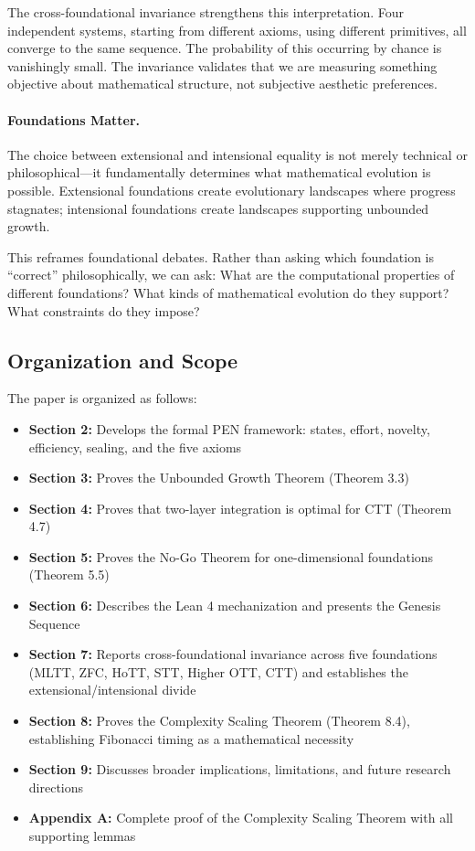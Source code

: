 \documentclass[11pt]{article}
\theoremstyle{definition}
\theoremstyle{remark}
\begin{document}
The cross-foundational invariance strengthens this interpretation. Four independent systems,
starting from different axioms, using different primitives, all converge to the same sequence. The
probability of this occurring by chance is vanishingly small. The invariance validates that we are
measuring something objective about mathematical structure, not subjective aesthetic preferences.

\paragraph{Foundations Matter.}
The choice between extensional and intensional equality is not merely technical or philosophical---it
fundamentally determines what mathematical evolution is possible. Extensional foundations create
evolutionary landscapes where progress stagnates; intensional foundations create landscapes supporting
unbounded growth.

This reframes foundational debates. Rather than asking which foundation is ``correct'' philosophically,
we can ask: What are the computational properties of different foundations? What kinds of mathematical
evolution do they support? What constraints do they impose?

\subsection{Organization and Scope}

The paper is organized as follows:

\begin{itemize}
\item \textbf{Section 2:} Develops the formal PEN framework: states, effort, novelty, efficiency, sealing, and
the five axioms
\item \textbf{Section 3:} Proves the Unbounded Growth Theorem (Theorem 3.3)
\item \textbf{Section 4:} Proves that two-layer integration is optimal for CTT (Theorem 4.7)
\item \textbf{Section 5:} Proves the No-Go Theorem for one-dimensional foundations (Theorem 5.5)
\item \textbf{Section 6:} Describes the Lean 4 mechanization and presents the Genesis Sequence
\item \textbf{Section 7:} Reports cross-foundational invariance across five foundations (MLTT, ZFC, HoTT,
STT, Higher OTT, CTT) and establishes the extensional/intensional divide
\item \textbf{Section 8:} Proves the Complexity Scaling Theorem (Theorem 8.4), establishing Fibonacci timing
as a mathematical necessity
\item \textbf{Section 9:} Discusses broader implications, limitations, and future research directions
\item \textbf{Appendix A:} Complete proof of the Complexity Scaling Theorem with all supporting lemmas
\end{itemize}
\end{document}
